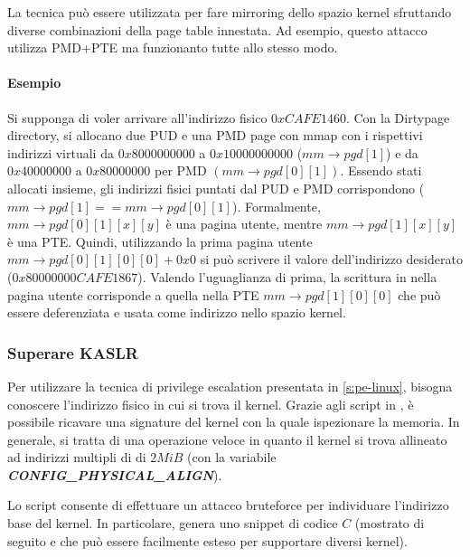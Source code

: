 \documentclass{article}
\begin{document}
La tecnica può essere utilizzata per fare mirroring dello spazio kernel sfruttando 
diverse combinazioni della page table innestata. Ad esempio, questo attacco utilizza PMD+PTE 
ma funzionanto tutte allo stesso modo. 

\paragraph{Esempio\cite{NetfilterTablesVulnerability}}
Si supponga di voler arrivare all'indirizzo fisico $0xCAFE1460$. 
Con la Dirtypage directory, si allocano due PUD e una PMD page con mmap con i rispettivi 
indirizzi virtuali da $0x8000000000$ a $0x10000000000$ ($mm\to pgd[1]$) e da $0x40000000$ a
$0x80000000$ per PMD $(mm\to pgd[0][1])$. Essendo stati allocati insieme, 
gli indirizzi fisici puntati dal PUD e PMD corrispondono ($mm \to pgd[1] == mm \to pgd[0][1]$). 
Formalmente, $mm\to pgd[0][1][x][y]$ è una pagina utente, mentre $mm\to pgd[1][x][y]$ è una 
PTE. Quindi, utilizzando la prima pagina utente $mm\to pgd[0][1][0][0]+0x0$ si può 
scrivere il valore dell'indirizzo desiderato ($0x80000000CAFE1867$). Valendo l'uguaglianza di 
prima, la scrittura in nella pagina utente corrisponde a quella nella PTE 
$mm\to pgd[1][0][0]$ che può essere deferenziata e usata come indirizzo nello spazio kernel.

\subsubsection{Superare KASLR}
Per utilizzare la tecnica di privilege escalation presentata in \cref{s:pe-linux}, 
bisogna conoscere l'indirizzo fisico in cui si trova il kernel. Grazie agli script in 
\cite{KernelSig}, è possibile ricavare una signature del kernel con la quale ispezionare 
la memoria. In generale, si tratta di una operazione veloce in quanto il kernel si trova 
allineato ad indirizzi multipli di di $2MiB$ (con la variabile \textbf{\textit{CONFIG\_PHYSICAL\_ALIGN}}). 

Lo script consente di effettuare un attacco bruteforce per individuare l'indirizzo base del 
kernel. In particolare, genera uno snippet di codice $C$ (mostrato di seguito e che può
essere facilmente esteso per supportare diversi kernel). 
\end{document}
